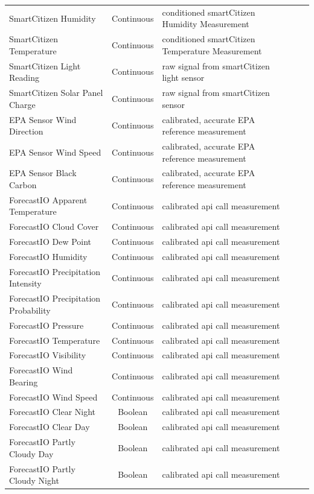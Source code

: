 \begin{table}[H]
\begin{tabular}{lclc|c|}
SmartCitizen Humidity & Continuous & conditioned smartCitizen Humidity Measurement \\
SmartCitizen Temperature & Continuous & conditioned smartCitizen Temperature Measurement \\
SmartCitizen Light Reading & Continuous & raw signal from smartCitizen light sensor \\
SmartCitizen Solar Panel Charge & Continuous & raw signal from smartCitizen sensor \\
EPA Sensor Wind Direction & Continuous & calibrated, accurate EPA reference measurement \\
EPA Sensor Wind Speed  & Continuous & calibrated, accurate EPA reference measurement \\
EPA Sensor Black Carbon  & Continuous & calibrated, accurate EPA reference measurement \\
ForecastIO Apparent Temperature & Continuous & calibrated api call measurement \\
ForecastIO Cloud Cover & Continuous & calibrated api call measurement \\
ForecastIO Dew Point & Continuous & calibrated api call measurement \\
ForecastIO Humidity & Continuous & calibrated api call measurement \\
ForecastIO Precipitation Intensity & Continuous & calibrated api call measurement \\
ForecastIO Precipitation Probability & Continuous & calibrated api call measurement \\
ForecastIO Pressure & Continuous & calibrated api call measurement \\
ForecastIO Temperature & Continuous & calibrated api call measurement \\
ForecastIO Visibility & Continuous & calibrated api call measurement \\
ForecastIO Wind Bearing & Continuous & calibrated api call measurement \\
ForecastIO Wind Speed & Continuous & calibrated api call measurement \\
ForecastIO Clear Night & Boolean & calibrated api call measurement \\
ForecastIO Clear Day & Boolean & calibrated api call measurement \\
ForecastIO Partly Cloudy Day & Boolean & calibrated api call measurement \\
ForecastIO Partly Cloudy Night & Boolean & calibrated api call measurement \\

\end{tabular}
\end{table}
